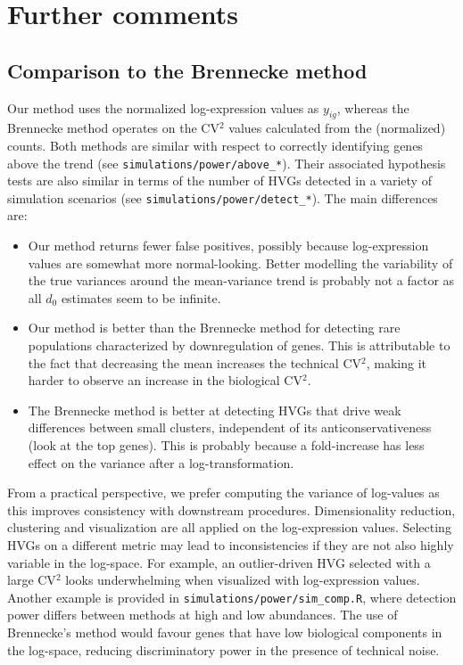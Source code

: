 \documentclass{article}
\begin{document}
\section{Further comments}

\subsection{Comparison to the Brennecke method}
Our method uses the normalized log-expression values as $y_{ig}$, whereas the Brennecke method operates on the CV$^2$ values calculated from the (normalized) counts.
Both methods are similar with respect to correctly identifying genes above the trend (see \texttt{simulations/power/above\_*}).
Their associated hypothesis tests are also similar in terms of the number of HVGs detected in a variety of simulation scenarios (see \texttt{simulations/power/detect\_*}).
The main differences are:
\begin{itemize}
\item Our method returns fewer false positives, possibly because log-expression values are somewhat more normal-looking. 
Better modelling the variability of the true variances around the mean-variance trend is probably not a factor as all $d_0$ estimates seem to be infinite.
\item Our method is better than the Brennecke method for detecting rare populations characterized by downregulation of genes.
This is attributable to the fact that decreasing the mean increases the technical CV$^2$, making it harder to observe an increase in the biological CV$^2$.
\item The Brennecke method is better at detecting HVGs that drive weak differences between small clusters, independent of its anticonservativeness (look at the top genes).
This is probably because a fold-increase has less effect on the variance after a log-transformation.
\end{itemize}

From a practical perspective, we prefer computing the variance of log-values as this improves consistency with downstream procedures.
Dimensionality reduction, clustering and visualization are all applied on the log-expression values.
Selecting HVGs on a different metric may lead to inconsistencies if they are not also highly variable in the log-space.
For example, an outlier-driven HVG selected with a large CV$^2$ looks underwhelming when visualized with log-expression values.
Another example is provided in \texttt{simulations/power/sim\_comp.R}, where detection power differs between methods at high and low abundances.
The use of Brennecke's method would favour genes that have low biological components in the log-space, reducing discriminatory power in the presence of technical noise.
\end{document}
